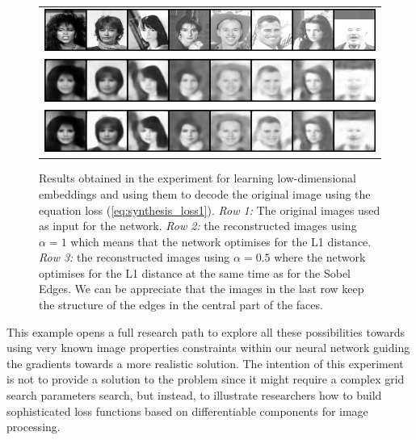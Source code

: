 \begin{figure}
    \begin{center}
        \begin{tabular}{c}
        \includegraphics[width=\textwidth]{main/chapter03/data/synthesis/celeb_gray.jpg} \\
        \includegraphics[width=\textwidth]{main/chapter03/data/synthesis/celeb_gray_l1.jpg} \\
        \includegraphics[width=\textwidth]{main/chapter03/data/synthesis/celeb_gray_l1+sobel.jpg} \\
        \end{tabular}
    \end{center}
    \caption{Results obtained in the experiment for learning low-dimensional embeddings and using them to decode the original image using the equation loss (\ref{eq:synthesis_loss1}). \textit{Row 1:} The original images used as input for the network. \textit{Row 2:} the reconstructed images using $\alpha = 1$ which means that the network optimises for the L1 distance. \textit{Row 3:} the reconstructed images using $\alpha = 0.5$ where the network optimises for the L1 distance at the same time as for the Sobel Edges. We can be appreciate that the images in the last row keep the structure of the edges in the central part of the faces.}
    \label{fig:synthesis}
\end{figure}

This example opens a full research path to explore all these possibilities towards using very known image properties constraints within our neural network guiding the gradients towards a more realistic solution. The intention of this experiment is not to provide a solution to the problem since it might require a complex grid search parameters search, but instead,  to illustrate researchers how to build sophisticated loss functions based on \lib{} differentiable components for image processing.

